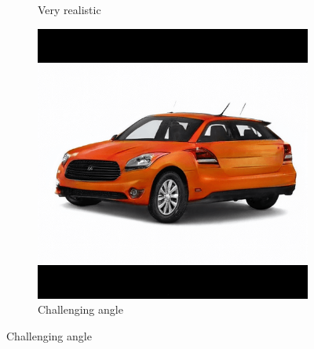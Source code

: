 \begin{figure}
\begin{subfigure}{.3\textwidth}
  \caption{Very realistic}
  \label{fig:survey_realistic}
\end{subfigure}
\hspace{.02\textwidth}
\begin{subfigure}{.3\textwidth}
  \centering
  \includegraphics[width=\textwidth]{images/single8.png}
  \caption{Challenging angle}
  \label{fig:survey_angle}
\end{subfigure}

\vspace{.02\textwidth}


\end{figure}

